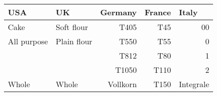 


\begin{tabular}{llrrr}
\toprule
\textbf{USA}      & \textbf{UK}      & \multicolumn{1}{l}{\textbf{Germany}}      & \multicolumn{1}{l}{\textbf{France}}      & \multicolumn{1}{l}{\textbf{Italy}} \\ \midrule
Cake              & Soft flour       & T405                                       & T45                                       & 00                                       \\ \midrule
All purpose       & Plain flour      & T550                                       & T55                                       & 0                                        \\ \midrule
                  &                  & T812                                       & T80                                       & 1                                        \\ \midrule
                  &                  & T1050                                      & T110                                      & 2                                        \\ \midrule
Whole             & Whole            & Vollkorn
                  & T150                                      & Integrale
                  \\ \bottomrule
\end{tabular}

